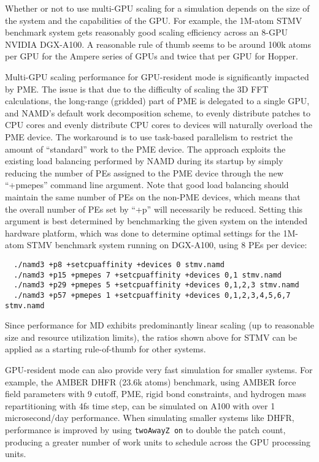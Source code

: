 Whether or not to use multi-GPU scaling for a simulation depends on
the size of the system and the capabilities of the GPU. 
For example, the 1M-atom STMV benchmark system gets reasonably
good scaling efficiency across an 8-GPU NVIDIA DGX-A100.
A reasonable rule of thumb seems to be around 100k atoms per GPU for
the Ampere series of GPUs and twice that per GPU for Hopper.

Multi-GPU scaling performance for GPU-resident mode
is significantly impacted by PME.
The issue is that due to the difficulty of scaling the 3D FFT calculations,
the long-range (gridded) part of PME is delegated to a single GPU,
and NAMD's default work decomposition scheme, to evenly distribute
patches to CPU cores and evenly distribute CPU cores to devices
will naturally overload the PME device.
The workaround is to use task-based parallelism to
restrict the amount of ``standard'' work to the PME device.
The approach exploits the existing load balancing performed by
NAMD during its startup by simply reducing the number of PEs
assigned to the PME device through the new ``+pmepes''
command line argument.
Note that good load balancing should maintain the same number of
PEs on the non-PME devices, which means that the overall
number of PEs set by ``+p'' will necessarily be reduced.
Setting this argument is best determined by benchmarking
the given system on the intended hardware platform,
which was done to determine
optimal settings for the 1M-atom STMV benchmark system
running on DGX-A100, using 8 PEs per device:
\begin{verbatim}
  ./namd3 +p8 +setcpuaffinity +devices 0 stmv.namd
  ./namd3 +p15 +pmepes 7 +setcpuaffinity +devices 0,1 stmv.namd
  ./namd3 +p29 +pmepes 5 +setcpuaffinity +devices 0,1,2,3 stmv.namd
  ./namd3 +p57 +pmepes 1 +setcpuaffinity +devices 0,1,2,3,4,5,6,7 stmv.namd
\end{verbatim}
Since performance for MD exhibits predominantly linear scaling
(up to reasonable size and resource utilization limits),
the ratios shown above for STMV can be applied as a starting
rule-of-thumb for other systems.

GPU-resident mode can also provide very fast simulation for smaller systems.
For example, the AMBER DHFR (23.6k atoms) benchmark,
using AMBER force field parameters with 9\;{\AA} cutoff, PME,
rigid bond constraints, and hydrogen mass repartitioning with 4\;fs time step,
can be simulated on A100 with over 1 microsecond/day performance.
When simulating smaller systems like DHFR,
performance is improved by using
\texttt{twoAwayZ on} to double the patch count,
producing a greater number of work units to schedule
across the GPU processing units.

